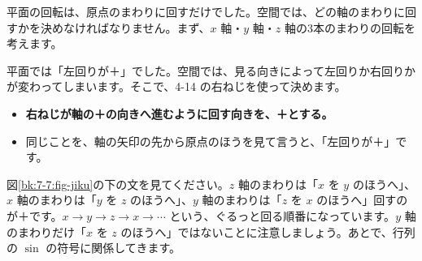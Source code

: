 


\label{bk:7-7:jiku}平面の回転は、原点のまわりに回すだけでした。空間では、どの軸のまわりに回すかを決めなければなりません。まず、$x$ 軸・$y$ 軸・$z$ 軸の3本のまわりの回転を考えます。

平面では「左回りが＋」でした。空間では、見る向きによって左回りか右回りかが変わってしまいます。そこで、4-14 の右ねじを使って決めます。
\begin{itemize}[leftmargin=1.2\zw, itemsep=2pt, topsep=2pt, label={\color{\bkTT}●}]
\item \textbf{右ねじが軸の＋の向きへ進むように回す向きを、＋とする。}
\item 同じことを、軸の矢印の先から原点のほうを見て言うと、「左回りが＋」です。
\end{itemize}
\begin{bkfigure}
\label{bk:7-7:fig-jiku}
\end{bkfigure}
図\ref{bk:7-7:fig-jiku}の下の文を見てください。$z$ 軸のまわりは「$x$ を $y$ のほうへ」、$x$ 軸のまわりは「$y$ を $z$ のほうへ」、$y$ 軸のまわりは「$z$ を $x$ のほうへ」回すのが＋です。$x\to y\to z\to x\to\cdots$ という、ぐるっと回る順番になっています。$y$ 軸のまわりだけ「$x$ を $z$ のほうへ」ではないことに注意しましょう。あとで、行列の $\sin$ の符号に関係してきます。

